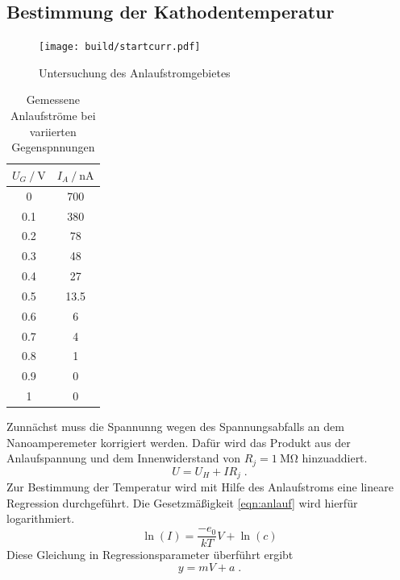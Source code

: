 \subsection{Bestimmung der Kathodentemperatur}
\begin{figure}
    \centering
    \caption{Untersuchung des Anlaufstromgebietes}
    \label{fig:startcurr}
    \texttt{[image: build/startcurr.pdf]}
\end{figure}
\begin{table}
    \centering
    \caption{Gemessene Anlaufströme bei variierten Gegenspnnungen}
    \label{tab:anlauf}
    \begin{tabular}{S[table-format = 1.1] S[table-format = 3.1]}
        \toprule
        {$U_G \mathbin{/} \si{\volt}$} & {$I_A \mathbin{/} \si{\nano\ampere}$} \\
           & 700   \\
        0.1 & 380   \\
        0.2 & 78    \\
        0.3 & 48    \\
        0.4 & 27    \\
        0.5 & 13.5  \\
        0.6 & 6     \\
        0.7 & 4     \\
        0.8 & 1     \\
        0.9 & 0     \\
        1   & 0     \\
        \bottomrule
    \end{tabular}
\end{table}
Zunnächst muss die Spannunng wegen des Spannungsabfalls an dem Nanoamperemeter korrigiert werden.
Dafür wird das Produkt aus der Anlaufspannung und dem Innenwiderstand von $R_j = \SI{1}{\mega\ohm}$ hinzuaddiert.
\begin{equation}
    U = U_H + I R_j \; \text{.} \label{eqn:Korrektur}
\end{equation}
Zur Bestimmung der Temperatur wird mit Hilfe des Anlaufstroms eine lineare Regression durchgeführt. 
Die Gesetzmäßigkeit \ref{eqn:anlauf} wird hierfür logarithmiert.
\begin{equation}
    \ln \left ( I \right ) = \frac{-e_0}{kT} V + \ln \left (c \right )
\end{equation}
Diese Gleichung in Regressionsparameter überführt ergibt
\begin{equation}
    y = mV + a \; \text{.}
\end{equation}
